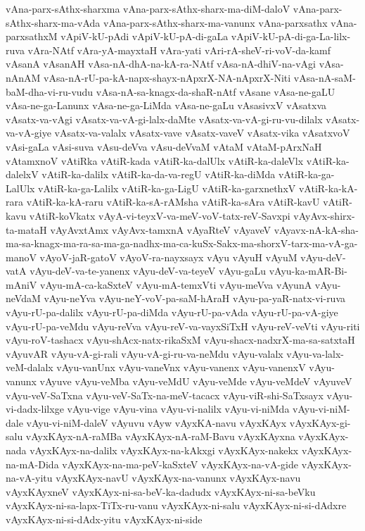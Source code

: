 {vAna-parx-sAthx-sharxma
vAna-parx-sAthx-sharx-ma-diM-daloV
vAna-parx-sAthx-sharx-ma-vAda
vAna-parx-sAthx-sharx-ma-vanunx
vAna-parxsathx
vAna-parxsathxM
vApiV-kU-pAdi
vApiV-kU-pA-di-gaLa
vApiV-kU-pA-di-ga-La-lilx-ruva
vAra-NAtf
vAra-yA-mayxtaH
vAra-yati
vAri-rA-sheV-ri-voV-da-kamf
vAsanA
vAsanAH
vAsa-nA-dhA-na-kA-ra-NAtf
vAsa-nA-dhiV-na-vAgi
vAsa-nAnAM
vAsa-nA-rU-pa-kA-napx-shayx-nApxrX-NA-nApxrX-Niti
vAsa-nA-saM-baM-dha-vi-ru-vudu
vAsa-nA-sa-knagx-da-shaR-nAtf
vAsane
vAsa-ne-gaLU
vAsa-ne-ga-Lanunx
vAsa-ne-ga-LiMda
vAsa-ne-gaLu
vAsasivxV
vAsatxva
vAsatx-va-vAgi
vAsatx-va-vA-gi-lalx-daMte
vAsatx-va-vA-gi-ru-vu-dilalx
vAsatx-va-vA-giye
vAsatx-va-valalx
vAsatx-vave
vAsatx-vaveV
vAsatx-vika
vAsatxvoV
vAsi-gaLa
vAsi-suva
vAsu-deVva
vAsu-deVvaM
vAtaM
vAtaM-pArxNaH
vAtamxnoV
vAtiRka
vAtiR-kada
vAtiR-ka-dalUlx
vAtiR-ka-daleVlx
vAtiR-ka-dalelxV
vAtiR-ka-dalilx
vAtiR-ka-da-va-regU
vAtiR-ka-diMda
vAtiR-ka-ga-LalUlx
vAtiR-ka-ga-Lalilx
vAtiR-ka-ga-LigU
vAtiR-ka-garxnethxV
vAtiR-ka-kA-rara
vAtiR-ka-kA-raru
vAtiR-ka-sA-rAMsha
vAtiR-ka-sAra
vAtiR-kavU
vAtiR-kavu
vAtiR-koVkatx
vAyA-vi-teyxV-va-meV-voV-tatx-reV-Savxpi
vAyAvx-shirx-ta-mataH
vAyAvxtAmx
vAyAvx-tamxnA
vAyaRteV
vAyaveV
vAyavx-nA-kA-sha-ma-sa-knagx-ma-ra-sa-ma-ga-nadhx-ma-ca-kuSx-Sakx-ma-shorxV-tarx-ma-vA-ga-manoV
vAyoV-jaR-gatoV
vAyoV-ra-nayxsayx
vAyu
vAyuH
vAyuM
vAyu-deV-vatA
vAyu-deV-va-te-yanenx
vAyu-deV-va-teyeV
vAyu-gaLu
vAyu-ka-mAR-Bi-mAniV
vAyu-mA-ca-kaSxteV
vAyu-mA-temxVti
vAyu-meVva
vAyunA
vAyu-neVdaM
vAyu-neYva
vAyu-neY-voV-pa-saM-hAraH
vAyu-pa-yaR-natx-vi-ruva
vAyu-rU-pa-dalilx
vAyu-rU-pa-diMda
vAyu-rU-pa-vAda
vAyu-rU-pa-vA-giye
vAyu-rU-pa-veMdu
vAyu-reVva
vAyu-reV-va-vayxSiTxH
vAyu-reV-veVti
vAyu-riti
vAyu-roV-tashacx
vAyu-shAcx-natx-rikaSxM
vAyu-shacx-nadxrX-ma-sa-satxtaH
vAyuvAR
vAyu-vA-gi-rali
vAyu-vA-gi-ru-va-neMdu
vAyu-valalx
vAyu-va-lalx-veM-dalalx
vAyu-vanUnx
vAyu-vaneVnx
vAyu-vanenx
vAyu-vanenxV
vAyu-vanunx
vAyuve
vAyu-veMba
vAyu-veMdU
vAyu-veMde
vAyu-veMdeV
vAyuveV
vAyu-veV-SaTxna
vAyu-veV-SaTx-na-meV-tacacx
vAyu-viR-shi-SaTxsayx
vAyu-vi-dadx-lilxge
vAyu-vige
vAyu-vina
vAyu-vi-nalilx
vAyu-vi-niMda
vAyu-vi-niM-dale
vAyu-vi-niM-daleV
vAyuvu
vAyw
vAyxKA-navu
vAyxKAyx
vAyxKAyx-gi-salu
vAyxKAyx-nA-raMBa
vAyxKAyx-nA-raM-Bavu
vAyxKAyxna
vAyxKAyx-nada
vAyxKAyx-na-dalilx
vAyxKAyx-na-kAkxgi
vAyxKAyx-nakekx
vAyxKAyx-na-mA-Dida
vAyxKAyx-na-ma-peV-kaSxteV
vAyxKAyx-na-vA-gide
vAyxKAyx-na-vA-yitu
vAyxKAyx-navU
vAyxKAyx-na-vanunx
vAyxKAyx-navu
vAyxKAyxneV
vAyxKAyx-ni-sa-beV-ka-dadudx
vAyxKAyx-ni-sa-beVku
vAyxKAyx-ni-sa-lapx-TiTx-ru-vanu
vAyxKAyx-ni-salu
vAyxKAyx-ni-si-dAdxre
vAyxKAyx-ni-si-dAdx-yitu
vAyxKAyx-ni-side
}
